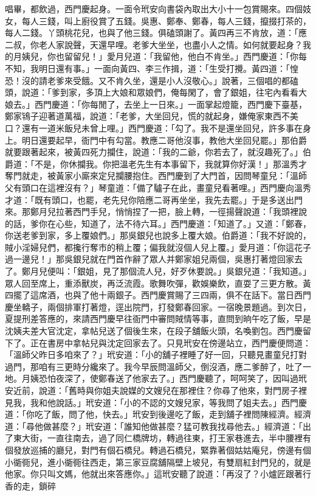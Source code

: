 \begin{showcontents}{}
唱畢，都飲過，西門慶起身。一面令玳安向書袋內取出大小十一包賞賜來。四個妓女，每人三錢，叫上廚役賞了五錢。吳惠、鄭奉、鄭春，每人三錢，攛掇打茶的，每人二錢。丫頭桃花兒，也與了他三錢。俱磕頭謝了。黃四再三不肯放，道：「應二叔，你老人家說聲，天還早哩。老爹大坐坐，也盡小人之情。如何就要起身？我的月姨兒，你也留留兒！」愛月兒道：「我留他，他白不肯坐。」西門慶道：「你每不知，我明日還有事。」一面向黃四、李三作揖，道：「生受打攪。黃四道：「惶恐！沒的請老爹來受餓。又不肯久坐，還是小人沒敬心。」說著，三個唱的都磕頭，說道：「爹到家，多頂上大娘和眾娘們，俺每閑了，會了銀姐，往宅內看看大娘去。」西門慶道：「你每閒了，去坐上一日來。」一面掌起燈籠，西門慶下臺基，鄭家鴇子迎著道萬福，說道：「老爹，大坐回兒，慌的就起身，嫌俺家東西不美口？還有一道米飯兒未曾上哩。」西門慶道：「勾了。我不是還坐回兒，許多事在身上。明日還要起早，衙門中有勾當。教應二哥他沒事，教他大坐回兒罷。」那伯爵就要跟著起來，被黃四死力攔住，說道：「我的二爺，你若去了，就沒趣死了。」伯爵道：「不是，你休攔我。你把溫老先生有本事留下，我就算你好漢！」那溫秀才奪門就走，被黃家小廝來定兒攔腰抱住。西門慶到了大門首，因問琴童兒：「溫師父有頭口在這裡沒有？」琴童道：「備了驢子在此，畫童兒看著哩。」西門慶向溫秀才道：「既有頭口，也罷，老先兒你陪應二哥再坐坐，我先去罷。」于是多送出門來。那鄭月兒拉著西門手兒，悄悄捏了一把，臉上轉，一徑揚聲說道：「我頭裡說的話，爹你在心些，知道了，法不待六耳。」西門慶道：「知道了。」又道：「鄭春，你送老爹到家，多上覆娘們。」那吳銀兒也說多上覆大娘。伯爵道：「我不好說的，賊小淫婦兒們，都攙行奪市的稍上覆；偏我就沒個人兒上覆。」愛月道：「你這花子過一邊兒！」那吳銀兒就在門首作辭了眾人并鄭家姐兒兩個，吳惠打著燈回家去了。鄭月兒便叫：「銀姐，見了那個流人兒，好歹休要說。」吳銀兒道：「我知道。」眾人回至席上，重添獸炭，再泛流霞。歌舞吹彈，歡娛樂飲，直耍了三更方散。黃四擺了這席酒，也與了他十兩銀子。西門慶賞賜了三四兩，俱不在話下。當日西門慶坐轎子，兩個排軍打著燈，逕出院門，打發鄭春回家。一宿晚景題過。到次日，夏提刑差答應的，來請西門慶早往衙門中審問賊情等事，直問到晌午吃了飯，早是沈姨夫差大官沈定，拿帖兒送了個後生來，在段子舖飯火頭，名喚劉包。西門慶留下了。正在書房中拿帖兒與沈定回家去了。只見玳安在傍邊站立，西門慶便問道：「溫師父昨日多咱來了？」玳安道：「小的舖子裡睡了好一回，只聽見畫童兒打對過門，那咱有三更時分纔來了。我今早辰問溫師父，倒沒酒，應二爹醉了，吐了一地。月姨恐怕夜深了，使鄭春送了他家去了。」西門慶聽了，呵呵笑了，因叫過玳安近前，說道：「舊時與你姐夫說媒的文嫂兒在那裡住？你尋了他來，對門房子裡見我，我和他說話。」玳安道：「小的不認的文嫂兒家，等我問了姐夫去。」西門慶道：「你吃了飯，問了他，快去。」玳安到後邊吃了飯，走到舖子裡問陳經濟。經濟道：「尋他做甚麼？」玳安道：「誰知他做甚麼？猛可教我找尋他去。」經濟道：「出了東大街，一直往南去，過了同仁橋牌坊，轉過往東，打王家巷進去，半中腰裡有個發放巡捕的廳兒，對門有個石橋兒。轉過石橋兒，緊靠著個姑姑庵兒，傍邊有個小衚衕兒，進小衚衕往西走，第三家豆腐舖隔壁上坡兒，有雙扇紅封門兒的，就是他家。你只叫文媽，他就出來答應你。」這玳安聽了說道：「再沒了？小爐匠跟著行香的走，鎖碎
\end{showcontents}
